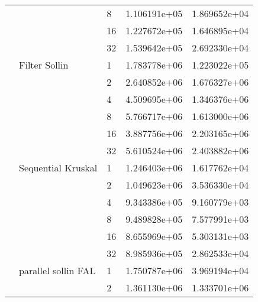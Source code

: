 \begin{tabular}{lllrr}
                                                       &                     & 8  &  1.106191e+05 &  1.869652e+04 \\
                                                       &                     & 16 &  1.227672e+05 &  1.646895e+04 \\
                                                       &                     & 32 &  1.539642e+05 &  2.692330e+04 \\
                                                       & Filter Sollin & 1  &  1.783778e+06 &  1.223022e+05 \\
                                                       &                     & 2  &  2.640852e+06 &  1.676327e+06 \\
                                                       &                     & 4  &  4.509695e+06 &  1.346376e+06 \\
                                                       &                     & 8  &  5.766717e+06 &  1.613000e+06 \\
                                                       &                     & 16 &  3.887756e+06 &  2.203165e+06 \\
                                                       &                     & 32 &  5.610524e+06 &  2.403882e+06 \\
                                                       & Sequential Kruskal & 1  &  1.246403e+06 &  1.617762e+04 \\
                                                       &                     & 2  &  1.049623e+06 &  3.536330e+04 \\
                                                       &                     & 4  &  9.343386e+05 &  9.160779e+03 \\
                                                       &                     & 8  &  9.489828e+05 &  7.577991e+03 \\
                                                       &                     & 16 &  8.655969e+05 &  5.303131e+03 \\
                                                       &                     & 32 &  8.985936e+05 &  2.862533e+04 \\
                                                       & parallel sollin FAL & 1  &  1.750787e+06 &  3.969194e+04 \\
                                                       &                     & 2  &  1.361130e+06 &  1.333701e+06 \\

\end{tabular}
